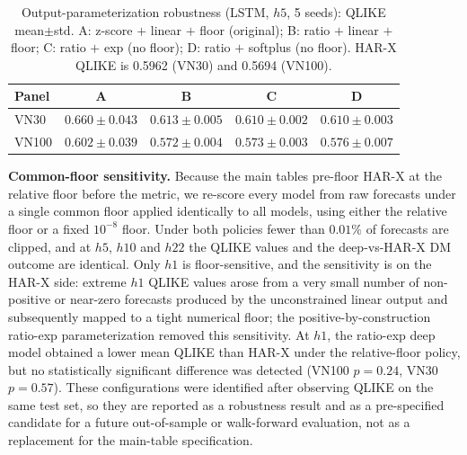 \documentclass[runningheads]{llncs}
\begin{document}
\begin{table}[t]
\centering
\caption{Output-parameterization robustness (LSTM, $h5$, 5 seeds): QLIKE mean$\pm$std. A: z-score $+$ linear $+$ floor (original); B: ratio $+$ linear $+$ floor; C: ratio $+$ exp (no floor); D: ratio $+$ softplus (no floor). HAR-X QLIKE is 0.5962 (VN30) and 0.5694 (VN100).}
\label{tab:robust}
\footnotesize
\setlength{\tabcolsep}{5pt}
\begin{tabular}{lcccc}
\toprule
Panel & A & B & C & D \\
\midrule
VN30  & $0.660\pm0.043$ & $0.613\pm0.005$ & $0.610\pm0.002$ & $0.610\pm0.003$ \\
VN100 & $0.602\pm0.039$ & $0.572\pm0.004$ & $0.573\pm0.003$ & $0.576\pm0.007$ \\
\bottomrule
\end{tabular}
\end{table}

\textbf{Common-floor sensitivity.} Because the main tables pre-floor HAR-X at the relative floor before the metric, we re-score every model from raw forecasts under a single common floor applied identically to all models, using either the relative floor or a fixed $10^{-8}$ floor. Under both policies fewer than $0.01\%$ of forecasts are clipped, and at $h5$, $h10$ and $h22$ the QLIKE values and the deep-vs-HAR-X DM outcome are identical. Only $h1$ is floor-sensitive, and the sensitivity is on the HAR-X side: extreme $h1$ QLIKE values arose from a very small number of non-positive or near-zero forecasts produced by the unconstrained linear output and subsequently mapped to a tight numerical floor; the positive-by-construction ratio-exp parameterization removed this sensitivity. At $h1$, the ratio-exp deep model obtained a lower mean QLIKE than HAR-X under the relative-floor policy, but no statistically significant difference was detected (VN100 $p=0.24$, VN30 $p=0.57$). These configurations were identified after observing QLIKE on the same test set, so they are reported as a robustness result and as a pre-specified candidate for a future out-of-sample or walk-forward evaluation, not as a replacement for the main-table specification.
\end{document}
